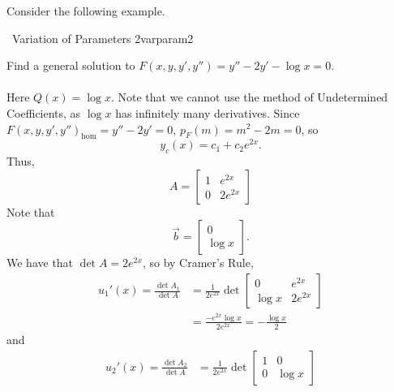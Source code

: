         Consider the following example.
        \begin{example}{\Difficulty\,\Difficulty\,\,Variation of Parameters 2}{varparam2}
            
            Find a general solution to \(F(x,y,y',y'')=y''-2y'-\log x=0\).
            \\
            \\
            Here \(Q(x)=\log x\). Note that we cannot use the method of Undetermined Coefficients, as \(\log x\) has infinitely many derivatives. Since \(F(x,y,y',y'')_\text{hom}=y''-2y'=0\), \(p_F(m)=m^2-2m=0\), so
            \begin{equation*}
                y_c(x)=c_1+c_2e^{2x}.
            \end{equation*}
            Thus,
            \begin{equation*}
                A=\begin{bmatrix}
                    1 & e^{2x} \\
                    0 & 2e^{2x}
                \end{bmatrix}
            \end{equation*}
            Note that
            \begin{equation*}
                \vec{b}=\begin{bmatrix}
                    0 \\
                    \log x
                \end{bmatrix}.
            \end{equation*}
            We have that \(\det A=2e^{2x}\), so by Cramer's Rule,
            \begin{align*}
                u_1'(x)=\frac{\det A_1}{\det A}&=\frac{1}{2e^{2x}}\det \begin{bmatrix}
                    0 & e^{2x} \\
                    \log x & 2e^{2x}
                \end{bmatrix} \\
                &=\frac{-e^{2x}\log x}{2e^{2x}}=-\frac{\log x}{2}
            \end{align*}
            and
            \begin{align*}
                u_2'(x)=\frac{\det A_2}{\det A}&=\frac{1}{2e^{2x}}\det \begin{bmatrix}
                    1 & 0 \\
                    0 & \log x
                \end{bmatrix} \\

\end{align*}
\end{example}
